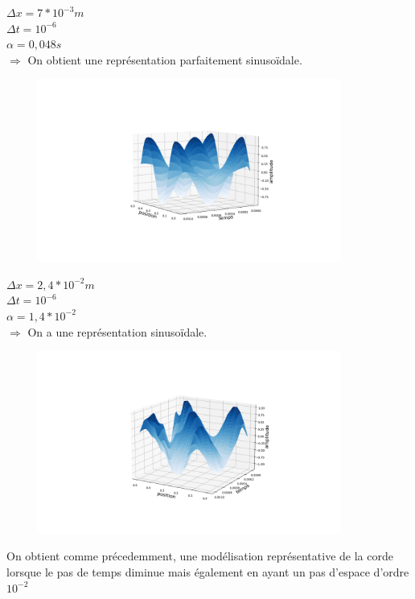 \begin{enumerate}[label=\alph*)]
\begin{minipage}{.45\textwidth}%

\item $\Delta x=7*{10}^{-3}m$ \\
$\Delta t= {10}^{-6}$ \\
$\alpha=0,048s $\\


$\Longrightarrow$ On obtient une représentation parfaitement sinusoïdale.

\end{minipage}%
\hfill
\begin{minipage}{.6\textwidth}%

\includegraphics[width=12cm,height=6cm]{dt=10^-6 avec dx= 0.007 .png}
\end{minipage}

\begin{minipage}{.45\textwidth}%

\item $\Delta x=2,4*{10}^{-2}m$ \\
$\Delta t= {10}^{-6}$ \\
$\alpha=1,4*{10}^{-2} $\\


$\Longrightarrow$ On a une représentation sinusoïdale. 
\end{minipage}%
\hfill
\begin{minipage}{.6\textwidth}%

\includegraphics[width=12cm,height=6cm]{dt=10^-6 avec dx=0.024.png}
\end{minipage}
On obtient comme précedemment, une modélisation représentative de la corde lorsque le pas de temps diminue mais également en ayant un pas d'espace d'ordre ${10}^{-2}$\\



\end{enumerate}
